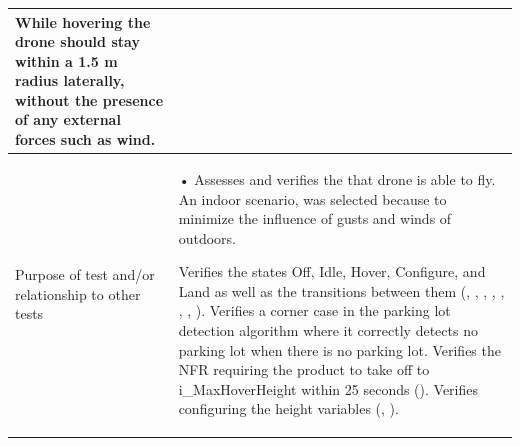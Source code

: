 \documentclass[12pt, titlepage]{article}
\begin{document}
\begin{table}[!h]
\begin{center}
\begin{tabular}{ | m{1.5cm} | m{15cm} | }
While hovering the drone should stay within a 1.5 m radius laterally, without the presence of any external forces such as wind.
 \\ 
\hline
Purpose of test and/or relationship to other tests &  • Assesses and verifies the that drone is able to fly. An indoor scenario, was selected because to minimize the influence of gusts and winds of outdoors.

Verifies the states Off, Idle, Hover, Configure, and Land as well as the transitions between them (\nameref{STA_000}, \nameref{STA_001}, \nameref{STA_004}, \nameref{STA_005}, \nameref{STA_006}, \nameref{TRANS_002}, \nameref{TRANS_003}, \nameref{TRANS_009}). 
Verifies a corner case in the parking lot detection algorithm where it correctly detects no parking lot when there is no parking lot.
Verifies the NFR requiring the product to take off to i\_MaxHoverHeight within 25 seconds (\nameref{PERF_002}).
Verifies configuring the height variables (\nameref{GEN_003}, \nameref{GEN_004}).
\\ 
\hline
\end{tabular}
\end{center}
\end{table}
\end{document}
